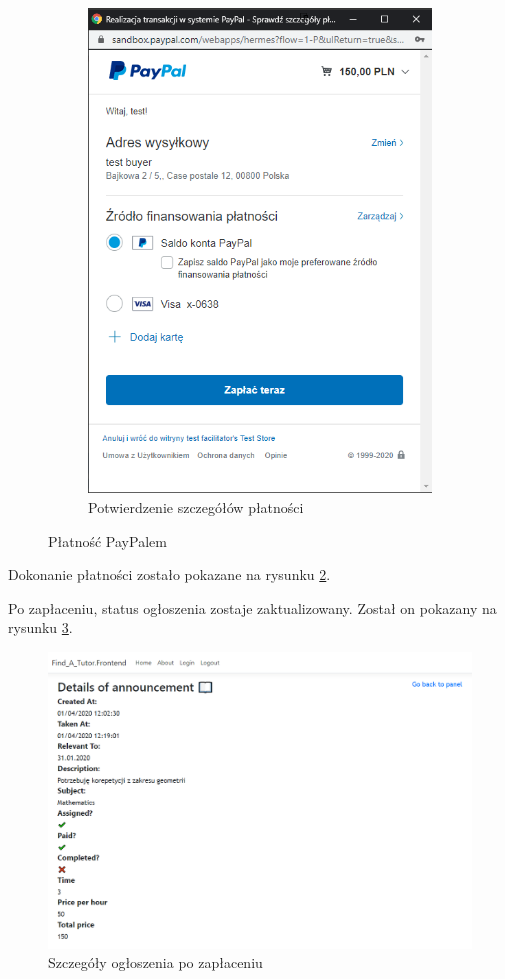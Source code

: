 \documentclass[12pt]{article}
\numberwithin{figure}{section}
\begin{document}
\begin{sloppypar}
\begin{figure}[H]
\begin{subfigure}{.5\textwidth}
      \includegraphics[width=.9\linewidth]{images/chapter_4/pay2.png}
      \caption{Potwierdzenie szczegółów płatności}
      \label{fig:paypal2}
    \end{subfigure}
    \caption{Płatność PayPalem}
    \label{fig:paypal}
\end{figure}

Dokonanie płatności zostało pokazane na rysunku \ref{fig:paypal}.

Po zapłaceniu, status ogłoszenia zostaje zaktualizowany. Został on pokazany na rysunku \ref{fig:details-paid}.
\begin{figure}[H] 
    \centering
    \includegraphics[width=1\textwidth]{images/chapter_4/details-paid.png}
    \caption{Szczegóły ogłoszenia po zapłaceniu}
    \label{fig:details-paid}
\end{figure}


\end{sloppypar}
\end{document}
